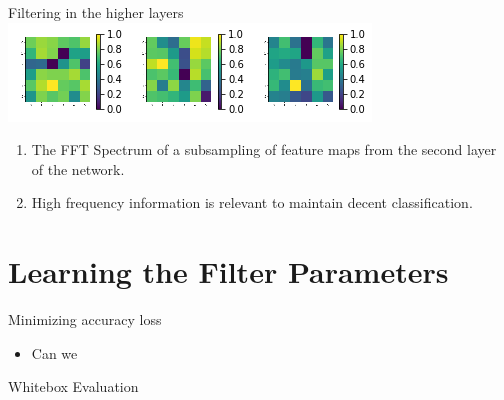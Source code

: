 \documentclass{beamer}
\begin{document}
\begin{frame}{Filtering in the higher layers}
	\centering
	\includegraphics[scale=0.7]{higher_filters.png}
	\begin{enumerate}
		\item The FFT Spectrum of a subsampling of feature maps from the second layer of the network.
		\pause
		\item High frequency information is relevant to maintain decent classification.
	\end{enumerate}
\end{frame}

\section{Learning the Filter Parameters}
\begin{frame}{Minimizing accuracy loss}
	\centering
	\begin{itemize}
		\item Can we 
	\end{itemize}
\end{frame}
\begin{frame}{Whitebox Evaluation}
	\begin{table}[t!]
	  \begin{center}
	    \caption{Results from white box evaluation}
	    \label{tab:table2}
	  \end{center}
	\end{table}
\end{frame}
\end{document}
